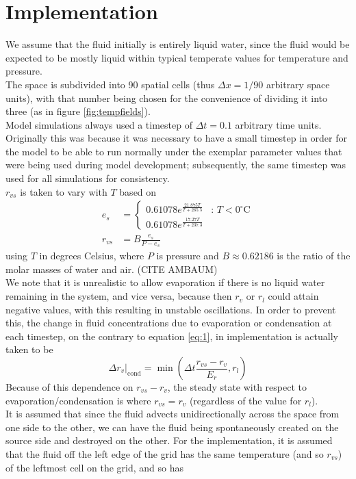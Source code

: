 \documentclass[11pt]{article}
\begin{document}
\section{Implementation}
We assume that the fluid initially is entirely liquid water, since the fluid would be expected to be mostly liquid within typical temperate values for temperature and pressure. \\
The space is subdivided into 90 spatial cells (thus $\Delta x=1/90$ arbitrary space units), with that number being chosen for the convenience of dividing it into three (as in figure \ref{fig:tempfields}). \\
Model simulations always used a timestep of $\Delta t=0.1$ arbitrary time units. Originally this was because it was necessary to have a small timestep in order for the model to be able to run normally under the exemplar parameter values that were being used during model development; subsequently, the same timestep was used for all simulations for consistency. \\
$r_{vs}$ is taken to vary with $T$ based on
\begin{align}
e_s &= \begin{cases}
0.61078 e^{\frac{21.875T}{T+265.5}} & \text{: $T<0^{\circ}$C} \\
0.61078 e^{\frac{17.27T}{T+237.3}} &
\end{cases} \label{eq:tetens} \\
r_{vs} &= B\frac{e_s}{P-e_s} \label{eq:magic}
\end{align}
using $T$ in degrees Celsius, where $P$ is pressure and $B\approx0.62186$ is the ratio of the molar masses of water and air. (CITE AMBAUM) \\
We note that it is unrealistic to allow evaporation if there is no liquid water remaining in the system, and vice versa, because then $r_v$ or $r_l$ could attain negative values, with this resulting in unstable oscillations. In order to prevent this, the change in fluid concentrations due to evaporation or condensation at each timestep, on the contrary to equation \ref{eq:1}, in implementation is actually taken to be
\begin{equation} \label{eq:2}
\Delta r_v|_{\text{cond}} = \min\left(\Delta t\frac{r_{vs} - r_v}{E_r},r_l\right)
\end{equation}
Because of this dependence on $r_{vs}-r_v$, the steady state with respect to evaporation/condensation is where $r_{vs}=r_v$ (regardless of the value for $r_l$). \\
It is assumed that since the fluid advects unidirectionally across the space from one side to the other, we can have the fluid being spontaneously created on the source side and destroyed on the other. For the implementation, it is assumed that the fluid off the left edge of the grid has the same temperature (and so $r_{vs}$) of the leftmost cell on the grid, and so has
\end{document}
